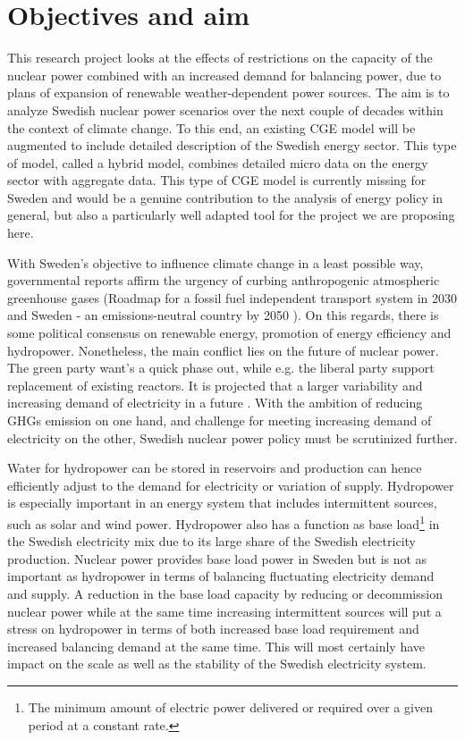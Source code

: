 \section{Objectives and aim}
This research project looks at the effects of restrictions on the capacity of the nuclear power combined with an increased demand for balancing power, due to plans of expansion of renewable weather-dependent power sources. The aim is to analyze Swedish nuclear power scenarios over the next couple of decades within the context of climate change. To this end, an existing CGE model will be augmented to include detailed description of the Swedish energy sector. This type of model, called a hybrid model, combines detailed micro data on the energy sector with aggregate data. This type of CGE model is currently missing for Sweden and would be a genuine contribution to the analysis of energy policy in general, but also a particularly well adapted tool for the project we are proposing here.


With Sweden's objective to influence climate change in a least possible way, governmental reports affirm the urgency of curbing anthropogenic atmospheric greenhouse gases (Roadmap for a fossil fuel independent transport system in 2030 \cite{SOU201384} and Sweden - an emissions-neutral country by 2050 \cite{sepa2012}). On this regards, there is some political consensus on renewable energy, promotion of energy efficiency and hydropower. Nonetheless, the main conflict lies on the future of nuclear power. The green party want's a quick phase out, while e.g. the liberal party support replacement of existing reactors. It is projected that a larger variability and increasing demand of electricity in a future \cite{sepa2012, SOU201384}. With the ambition of reducing GHGs emission on one hand, and challenge for meeting increasing demand of electricity on the other, Swedish nuclear power policy must be scrutinized further.

Water for hydropower can be stored in reservoirs and production can hence efficiently adjust to the demand for electricity or variation of supply. Hydropower is especially important in an energy system that includes intermittent sources, such as solar and wind power. Hydropower also has a function as base load\footnote{The minimum amount of electric power delivered or required over a given period at a constant rate.} in the Swedish electricity mix due to its large share of the Swedish electricity production. Nuclear power provides base load power in Sweden but is not as important as hydropower in terms of balancing fluctuating electricity demand and supply. A reduction in the base load capacity by reducing or decommission nuclear power while at the same time increasing intermittent sources will put a stress on hydropower in terms of both increased base load requirement and increased balancing demand at the same time. This will most certainly have impact on the scale as well as the stability of the Swedish electricity system.

